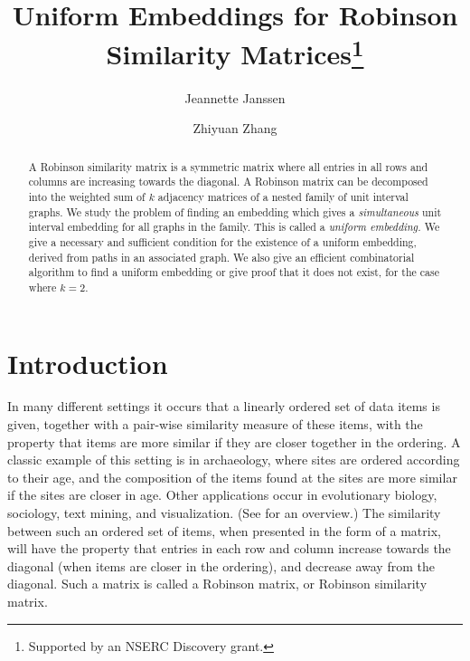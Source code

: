 \documentclass[runningheads]{llncs}
\begin{document}
%
\title{Uniform Embeddings for Robinson Similarity Matrices\thanks{Supported by an NSERC Discovery grant.}}
%
%
\author{Jeannette Janssen \and
Zhiyuan Zhang}%
%
%
%
\maketitle              %
%
\begin{abstract}
A Robinson similarity matrix is a symmetric matrix where all entries in all rows and columns are increasing towards the diagonal.
A Robinson matrix can be decomposed into the weighted sum of $k$ adjacency matrices of a nested family of unit interval graphs. We study the problem of finding an embedding which gives a \emph{simultaneous} unit interval embedding for all graphs in the family. This is called a \emph{uniform embedding.}
We give a necessary and sufficient condition for the existence of a uniform embedding, derived from paths in an associated graph. We also give an efficient combinatorial algorithm to find a uniform embedding or give proof that it does not exist, for the case where $k=2$.   

\end{abstract}

%

\section{Introduction}

In many different settings it occurs that a linearly ordered set of data items is given, together with a pair-wise similarity measure of these items, with the property that items are more similar if they are closer together in the ordering. A classic example of this setting is in archaeology, where sites are ordered according to their age, and the composition of the items found at the sites are more similar if the sites are closer in age. Other applications occur in evolutionary biology, sociology, text mining, and visualization. (See \cite{liiv2010seriation} for an overview.) The similarity between such an ordered set of items, when presented in the form of a matrix, will have the property that entries in each row and column increase towards the diagonal (when items are closer in the ordering), and decrease away from the diagonal. Such a matrix is called a  Robinson matrix, or Robinson similarity matrix. 
\end{document}
